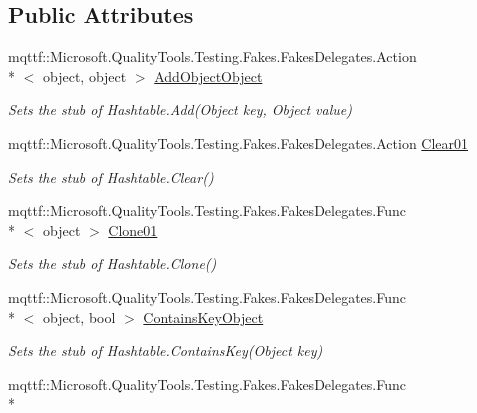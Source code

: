 \subsection*{Public Attributes}
\begin{DoxyCompactItemize}
\item 
mqttf\-::\-Microsoft.\-Quality\-Tools.\-Testing.\-Fakes.\-Fakes\-Delegates.\-Action\\*
$<$ object, object $>$ \hyperlink{class_system_1_1_configuration_1_1_fakes_1_1_stub_settings_attribute_dictionary_a347b53278f5527063690461ab85c0df2}{Add\-Object\-Object}
\begin{DoxyCompactList}\small\item\em Sets the stub of Hashtable.\-Add(\-Object key, Object value)\end{DoxyCompactList}\item 
mqttf\-::\-Microsoft.\-Quality\-Tools.\-Testing.\-Fakes.\-Fakes\-Delegates.\-Action \hyperlink{class_system_1_1_configuration_1_1_fakes_1_1_stub_settings_attribute_dictionary_a3c518479b464cc42841ed0778a25d6f1}{Clear01}
\begin{DoxyCompactList}\small\item\em Sets the stub of Hashtable.\-Clear()\end{DoxyCompactList}\item 
mqttf\-::\-Microsoft.\-Quality\-Tools.\-Testing.\-Fakes.\-Fakes\-Delegates.\-Func\\*
$<$ object $>$ \hyperlink{class_system_1_1_configuration_1_1_fakes_1_1_stub_settings_attribute_dictionary_a48ea77b8f681f8bcf2304b6ea5297ee5}{Clone01}
\begin{DoxyCompactList}\small\item\em Sets the stub of Hashtable.\-Clone()\end{DoxyCompactList}\item 
mqttf\-::\-Microsoft.\-Quality\-Tools.\-Testing.\-Fakes.\-Fakes\-Delegates.\-Func\\*
$<$ object, bool $>$ \hyperlink{class_system_1_1_configuration_1_1_fakes_1_1_stub_settings_attribute_dictionary_a3d68f2e965f5a2b1c31e85da9f04e357}{Contains\-Key\-Object}
\begin{DoxyCompactList}\small\item\em Sets the stub of Hashtable.\-Contains\-Key(\-Object key)\end{DoxyCompactList}\item 
mqttf\-::\-Microsoft.\-Quality\-Tools.\-Testing.\-Fakes.\-Fakes\-Delegates.\-Func\\*

\end{DoxyCompactItemize}
